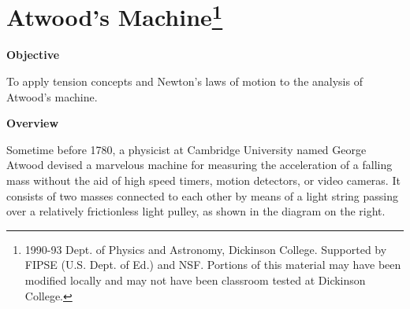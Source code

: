 
\section{Atwood's Machine\footnote{
1990-93 Dept. of Physics and Astronomy, Dickinson College. Supported by FIPSE
(U.S. Dept. of Ed.) and NSF. Portions of this material may have been modified
locally and may not have been classroom tested at Dickinson College.
}}

\makelabheader %

\textbf{Objective }

To apply tension concepts and Newton's laws of motion to the analysis of Atwood's
machine.

\textbf{Overview }

Sometime before 1780, a physicist at Cambridge University named George Atwood
devised a marvelous machine for measuring the acceleration of a falling mass
without the aid of high speed timers, motion detectors, or video cameras. It
consists of two masses connected to each other by means of a light string passing
over a relatively frictionless light pulley, as shown in the diagram on the right.


